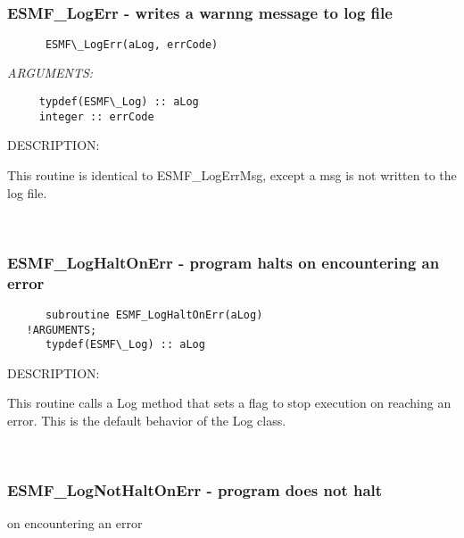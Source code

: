  
\mbox{}\hrulefill\ 
 
\subsubsection [ESMF\_LogErr] {ESMF\_LogErr - writes a warnng message to log file}


  
\begin{verbatim}      ESMF\_LogErr(aLog, errCode)\end{verbatim}{\em ARGUMENTS:}
\begin{verbatim}     typdef(ESMF\_Log) :: aLog
     integer :: errCode\end{verbatim}
{\sf DESCRIPTION:\\ }


     This routine is identical to ESMF\_LogErrMsg, except a msg is
     not written to the log file.
   
 
\mbox{}\hrulefill\ 
 

  \subsubsection [ESMF\_LogHaltOnErr] {ESMF\_LogHaltOnErr - program halts on encountering an error}


  
\begin{verbatim}      subroutine ESMF_LogHaltOnErr(aLog)
   !ARGUMENTS;
      typdef(ESMF\_Log) :: aLog\end{verbatim}
{\sf DESCRIPTION:\\ }


      This routine calls a Log method that sets a flag to stop execution on
      reaching an error. This is the default behavior of the Log class. 
 
\mbox{}\hrulefill\ 
 

  \subsubsection [ESMF\_LogNotHaltOnErr] {ESMF\_LogNotHaltOnErr - program does not halt}


                                     on encountering an error
  
